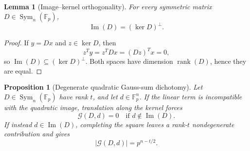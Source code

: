 \documentclass[11pt]{article}
\newcommand{\F}{\mathbb F}
\newcommand{\Sym}{\operatorname{Sym}}
\newcommand{\rank}{\operatorname{rank}}
\newcommand{\im}{\operatorname{Im}}
\newcommand{\1}{\mathbf 1}
\theoremstyle{plain}
\newtheorem{lemma}[theorem]{Lemma}
\newtheorem{proposition}[theorem]{Proposition}
\theoremstyle{definition}
\theoremstyle{remark}
\begin{document}
\begin{lemma}[Image--kernel orthogonality]
\label{lem:appB-image-kernel-orthogonality}
For every symmetric matrix $D\in\Sym_n(\F_p)$,
\begin{equation}
  \im(D)=(\ker D)^\perp.
  \label{eq:appB-image-kernel-orthogonality}
\end{equation}
\end{lemma}

\begin{proof}
If $y=Dx$ and $z\in\ker D$, then
\begin{equation}
  z^Ty=z^TDx=(Dz)^Tx=0,
  \label{eq:appB-image-contained-orthogonal}
\end{equation}
so $\im(D)\subseteq(\ker D)^\perp$.  Both spaces have dimension
$\rank(D)$, hence they are equal.
\end{proof}

\begin{proposition}[Degenerate quadratic Gauss-sum dichotomy]
\label{prop:appB-degenerate-Gauss-dichotomy}
Let $D\in\Sym_n(\F_p)$ have rank $t$, and let $d\in\F_p^n$.  If the linear
term is incompatible with the quadratic image, translation along the kernel
forces
\begin{equation}
  \mathcal G(D,d)=0
  \quad\text{if }d\notin\im(D).
  \label{eq:appB-incompatible-Gauss-vanishes}
\end{equation}
If instead $d\in\im(D)$, completing the square leaves a rank-$t$
nondegenerate contribution and gives
\begin{equation}
  \lvert\mathcal G(D,d)\rvert=p^{n-t/2}.
  \label{eq:appB-compatible-Gauss-absolute-value}
\end{equation}
\end{proposition}
\end{document}
